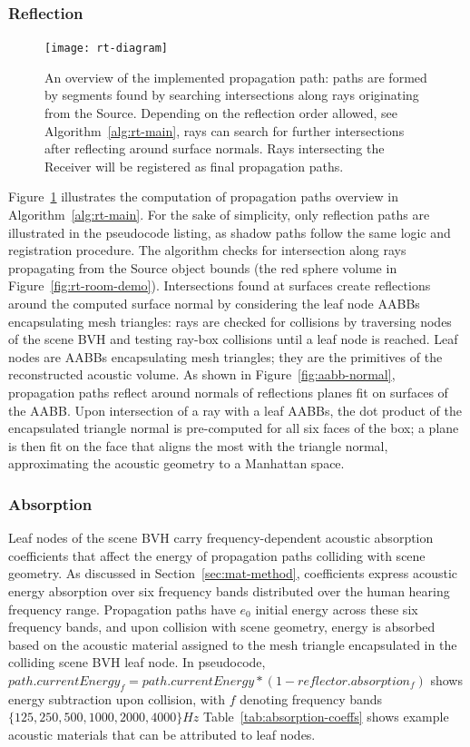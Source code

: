 \subsubsection{Reflection}
\begin{figure}[h]
    \centering
    \texttt{[image: rt-diagram]}
    \caption{An overview of the implemented propagation path: paths are formed by segments found by searching intersections along rays originating from the Source. Depending on the reflection order allowed, see Algorithm~\ref{alg:rt-main}, rays can search for further intersections after reflecting around surface normals. Rays intersecting the Receiver will be registered as final propagation paths.}
\label{fig:rt-reflection-diagram}
\end{figure}
Figure~\ref{fig:rt-reflection-diagram} illustrates the computation of propagation paths overview in Algorithm~\ref{alg:rt-main}. For the sake of simplicity, only reflection paths are illustrated in the pseudocode listing, as shadow paths follow the same logic and registration procedure. The algorithm checks for intersection along rays propagating from the Source object bounds (the red sphere volume in Figure~\ref{fig:rt-room-demo}). Intersections found at surfaces create reflections around the computed surface normal by considering the leaf node AABBs encapsulating mesh triangles: rays are checked for collisions by traversing nodes of the scene BVH and testing ray-box collisions until a leaf node is reached. Leaf nodes are AABBs encapsulating mesh triangles; they are the primitives of the reconstructed acoustic volume. As shown in Figure~\ref{fig:aabb-normal}, propagation paths reflect around normals of reflections planes fit on surfaces of the AABB. Upon intersection of a ray with a leaf AABBs, the dot product of the encapsulated triangle normal is pre-computed for all six faces of the box; a plane is then fit on the face that aligns the most with the triangle normal, approximating the acoustic geometry to a Manhattan space.\par

\subsubsection{Absorption}
Leaf nodes of the scene BVH carry frequency-dependent acoustic absorption coefficients that affect the energy of propagation paths colliding with scene geometry. As discussed in Section~\ref{sec:mat-method}, coefficients express acoustic energy absorption over six frequency bands distributed over the human hearing frequency range. Propagation paths have $e_0$ initial energy across these six frequency bands, and upon collision with scene geometry, energy is absorbed based on the acoustic material assigned to the mesh triangle encapsulated in the colliding scene BVH leaf node. In pseudocode, $path.currentEnergy_f = path.currentEnergy * (1 - reflector.absorption_f)$ shows energy subtraction upon collision, with $f$ denoting frequency bands $\{ 125, 250, 500, 1000, 2000, 4000 \} Hz$ Table~\ref{tab:absorption-coeffs} shows example acoustic materials that can be attributed to leaf nodes. \par

